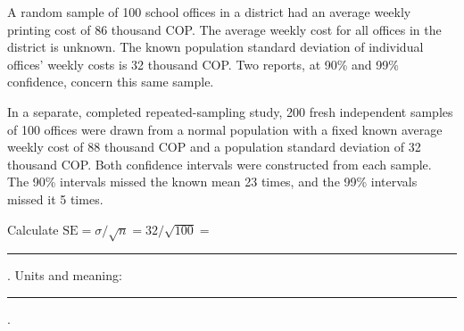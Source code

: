 \clearpage

\vspace{-4mm}
A random sample of 100 school offices in a district had an average weekly printing cost of 86 thousand COP. The average weekly cost for all offices in the district is unknown. The known population standard deviation of individual offices' weekly costs is 32 thousand COP. Two reports, at 90\% and 99\% confidence, concern this same sample.

In a separate, completed repeated-sampling study, 200 fresh independent samples of 100 offices were drawn from a normal population with a fixed known average weekly cost of 88 thousand COP and a population standard deviation of 32 thousand COP. Both confidence intervals were constructed from each sample. The 90\% intervals missed the known mean 23 times, and the 99\% intervals missed it 5 times.


\par\noindent\begin{minipage}[t]{.49\linewidth}
\vspace{0pt}
\end{minipage}\hfill
\begin{minipage}[t]{.49\linewidth}
\vspace{0pt}
\end{minipage}\par
Calculate $\mathrm{SE}=\sigma/\sqrt n=32/\sqrt{100}=$ \rule{.7in}{.3pt}. Units and meaning: \rule{1.8in}{.3pt}.

